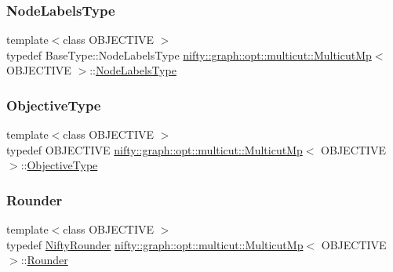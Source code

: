 \subsubsection{\texorpdfstring{Node\+Labels\+Type}{NodeLabelsType}}
{\footnotesize\ttfamily template$<$class O\+B\+J\+E\+C\+T\+I\+VE $>$ \\
typedef Base\+Type\+::\+Node\+Labels\+Type \hyperlink{classnifty_1_1graph_1_1opt_1_1multicut_1_1MulticutMp}{nifty\+::graph\+::opt\+::multicut\+::\+Multicut\+Mp}$<$ O\+B\+J\+E\+C\+T\+I\+VE $>$\+::\hyperlink{classnifty_1_1graph_1_1opt_1_1multicut_1_1MulticutMp_a7afb88ab31185de5cef8a3d98022c0a2}{Node\+Labels\+Type}}

\mbox{\label{classnifty_1_1graph_1_1opt_1_1multicut_1_1MulticutMp_a9fefe9d9756a1eef71329656d2fdf9f4}} 
\subsubsection{\texorpdfstring{Objective\+Type}{ObjectiveType}}
{\footnotesize\ttfamily template$<$class O\+B\+J\+E\+C\+T\+I\+VE $>$ \\
typedef O\+B\+J\+E\+C\+T\+I\+VE \hyperlink{classnifty_1_1graph_1_1opt_1_1multicut_1_1MulticutMp}{nifty\+::graph\+::opt\+::multicut\+::\+Multicut\+Mp}$<$ O\+B\+J\+E\+C\+T\+I\+VE $>$\+::\hyperlink{classnifty_1_1graph_1_1opt_1_1multicut_1_1MulticutMp_a9fefe9d9756a1eef71329656d2fdf9f4}{Objective\+Type}}

\mbox{\label{classnifty_1_1graph_1_1opt_1_1multicut_1_1MulticutMp_a797fe1696d6c09f66835e7899cf3c9fb}} 
\subsubsection{\texorpdfstring{Rounder}{Rounder}}
{\footnotesize\ttfamily template$<$class O\+B\+J\+E\+C\+T\+I\+VE $>$ \\
typedef \hyperlink{structnifty_1_1graph_1_1opt_1_1multicut_1_1MulticutMp_1_1NiftyRounder}{Nifty\+Rounder} \hyperlink{classnifty_1_1graph_1_1opt_1_1multicut_1_1MulticutMp}{nifty\+::graph\+::opt\+::multicut\+::\+Multicut\+Mp}$<$ O\+B\+J\+E\+C\+T\+I\+VE $>$\+::\hyperlink{classnifty_1_1graph_1_1opt_1_1multicut_1_1MulticutMp_a797fe1696d6c09f66835e7899cf3c9fb}{Rounder}}

